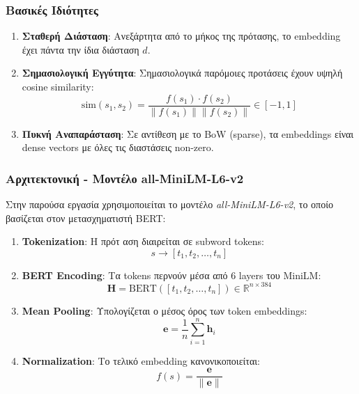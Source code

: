 \documentclass[12pt,a4paper,twoside]{book}
\begin{document}
\subsubsection{Βασικές Ιδιότητες}

\begin{enumerate}
    \item \textbf{Σταθερή Διάσταση}: Ανεξάρτητα από το μήκος της πρότασης, το embedding έχει πάντα την ίδια διάσταση \(d\).

    \item \textbf{Σημασιολογική Εγγύτητα}: Σημασιολογικά παρόμοιες προτάσεις έχουν υψηλή cosine similarity:
          \begin{equation}
              \text{sim}(s_1, s_2) = \frac{f(s_1) \cdot f(s_2)}{\|f(s_1)\| \|f(s_2)\|} \in [-1, 1]
          \end{equation}

    \item \textbf{Πυκνή Αναπαράσταση}: Σε αντίθεση με το BoW (sparse), τα embeddings είναι dense vectors με όλες τις διαστάσεις non-zero.
\end{enumerate}

\subsubsection{Αρχιτεκτονική - Μοντέλο all-MiniLM-L6-v2}

Στην παρούσα εργασία χρησιμοποιείται το μοντέλο \textit{all-MiniLM-L6-v2}, το οποίο βασίζεται στον μετασχηματιστή BERT:

\begin{enumerate}
    \item \textbf{Tokenization}: Η πρότ αση διαιρείται σε subword tokens:
          \begin{equation}
              s \rightarrow [t_1, t_2, \ldots, t_n]
          \end{equation}

    \item \textbf{BERT Encoding}: Τα tokens περνούν μέσα από 6 layers του MiniLM:
          \begin{equation}
              \mathbf{H} = \text{BERT}([t_1, t_2, \ldots, t_n]) \in \mathbb{R}^{n \times 384}
          \end{equation}

    \item \textbf{Mean Pooling}: Υπολογίζεται ο μέσος όρος των token embeddings:
          \begin{equation}
              \mathbf{e} = \frac{1}{n} \sum_{i=1}^{n} \mathbf{h}_i
          \end{equation}

    \item \textbf{Normalization}: Το τελικό embedding κανονικοποιείται:
          \begin{equation}
              f(s) = \frac{\mathbf{e}}{\|\mathbf{e}\|}
          \end{equation}
\end{enumerate}
\end{document}
